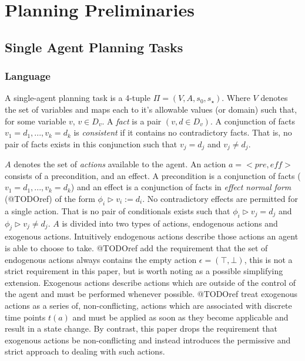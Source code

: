 \documentclass{article}
\theoremstyle{plain}
\theoremstyle{definition}
\begin{document}
\section{Planning Preliminaries}

\subsection{Single Agent Planning Tasks}
\subsubsection*{Language}
A single-agent planning task is a 4-tuple $\Pi=(V, A, s_0, s_\star)$. Where $V$ denotes the set of variables and maps each to it's allowable values (or domain) such that, for some variable $v$, $v \in D_v$. A \textit{fact} is a pair $(v, d \in D_v)$. A conjunction of facts $v_1=d_1,...,v_k=d_k$ is \textit{consistent} if it contains no contradictory facts. That is, no pair of facts exists in this conjunction such that $v_j=d_j$ and $v_j \neq d_j$.

$A$ denotes the set of \textit{actions} available to the agent. An action $a=<pre,eff>$ consists of a precondition, and an effect. A precondition is a conjunction of facts ($v_1=d_1,...,v_k=d_k$) and an effect is a conjunction of facts in \textit{effect normal form} (@TODOref) of the form $\phi_i \triangleright v_i:=d_i$. No contradictory effects are permitted for a single action. That is no pair of conditionals exists such that $\phi_i \triangleright v_j=d_j$ and $\phi_j \triangleright v_j \neq d_j$. $A$ is divided into two types of actions, endogenous actions and exogenous actions. Intuitively endogenous actions describe those actions an agent is able to choose to take. @TODOref add the requirement that the set of endogenous actions always contains the empty action $\epsilon=(\top,\bot)$, this is not a strict requirement in this paper, but is worth noting as a possible simplifying extension. Exogenous actions describe actions which are outside of the control of the agent and must be performed whenever possible. @TODOref treat exogenous actions as a series of, non-conflicting, actions which are associated with discrete time points $t(a)$ and must be applied as soon as they become applicable and result in a state change. By contrast, this paper drops the requirement that exogenous actions be non-conflicting and instead introduces the permissive and strict approach to dealing with such actions.
\end{document}
